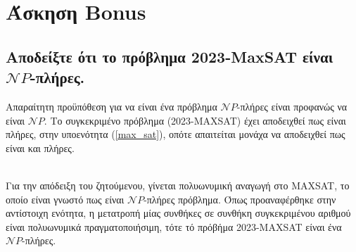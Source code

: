 \section{Άσκηση Bonus}
\subsection{Αποδείξτε ότι το πρόβλημα 2023-MaxSAT είναι $\mathcal{N}P$-πλήρες.}

Απαραίτητη προϋπόθεση για να είναι ένα πρόβλημα $\mathcal{N}P$-πλήρες είναι προφανώς να είναι $\mathcal{N}P$. Το συγκεκριμένο πρόβλημα (2023-MAXSAT) έχει αποδειχθεί πως είναι πλήρες, στην υποενότητα (\ref{max_sat}), οπότε απαιτείται μονάχα να αποδειχθεί πως είναι και πλήρες.

\noindent\\
Για την απόδειξη του ζητούμενου, γίνεται πολυωνυμική αναγωγή στο MAXSAT, το οποίο είναι γνωστό πως είναι $\mathcal{N}P$-πλήρες πρόβλημα. Όπως προαναφέρθηκε στην αντίστοιχη ενότητα, η μετατροπή μίας συνθήκες σε συνθήκη συγκεκριμένου αριθμού είναι πολυωνυμικά πραγματοποιήσιμη, τότε τό πρόβήμα 2023-MAXSAT είναι ένα $\mathcal{N}P$-πλήρες.
